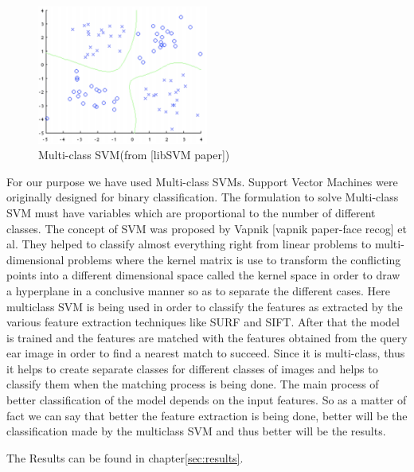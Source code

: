 \begin{figure}[b]
	\begin{center}
		\includegraphics[width=0.5\textwidth]{Figures/Figure10}
	\end{center}
	\caption{Multi-class SVM(from [libSVM paper])}
	\label{fig:Figure10}
\end{figure}


For our purpose we have used Multi-class SVMs. Support Vector Machines were originally designed for binary classification. The formulation to solve Multi-class SVM must have variables which are proportional to the number of different classes. The concept of SVM was proposed by Vapnik [vapnik paper-face recog] et al. They helped to classify almost everything right from linear problems to multi-dimensional problems where the kernel matrix is use to transform the conflicting points into a different dimensional space called the kernel space in order to draw a hyperplane in a conclusive manner so as to separate the different cases. Here multiclass SVM is being used in order to classify the features as extracted by the various feature extraction techniques like SURF and SIFT. After that the model is trained and the features are matched with the features obtained from the query ear image in order to find a nearest match to succeed. Since it is multi-class, thus it helps to create separate classes for different classes of images and helps to classify them when the matching process is being done. The main process of better classification of the model depends on the input features. So as a matter of fact we can say that better the feature extraction is being done, better will be the classification made by the multiclass SVM and thus better will be the results.

The Results can be found in chapter\ref{sec:results}.

